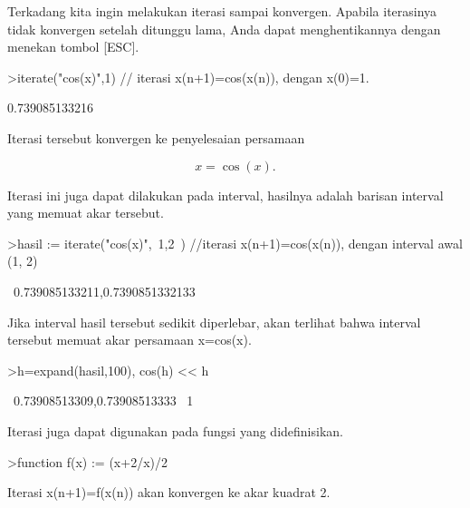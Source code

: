 \documentclass[a4paper,10pt]{article}
\begin{document}
\begin{eulernotebook}
\begin{eulercomment}
\end{eulercomment}
\begin{eulercomment}
Terkadang kita ingin melakukan iterasi sampai konvergen. Apabila
iterasinya tidak konvergen setelah ditunggu lama, Anda dapat
menghentikannya dengan menekan tombol [ESC].
\end{eulercomment}
\begin{eulerprompt}
>iterate("cos(x)",1) // iterasi x(n+1)=cos(x(n)), dengan x(0)=1.
\end{eulerprompt}
\begin{euleroutput}
  0.739085133216
\end{euleroutput}
\begin{eulercomment}
Iterasi tersebut konvergen ke penyelesaian persamaan

\end{eulercomment}
\begin{eulerformula}
\[
x = \cos(x).
\]
\end{eulerformula}
\begin{eulercomment}
Iterasi ini juga dapat dilakukan pada interval, hasilnya adalah
barisan interval yang memuat akar tersebut.
\end{eulercomment}
\begin{eulerprompt}
>hasil := iterate("cos(x)",~1,2~) //iterasi x(n+1)=cos(x(n)), dengan interval awal (1, 2)
\end{eulerprompt}
\begin{euleroutput}
  ~0.739085133211,0.7390851332133~
\end{euleroutput}
\begin{eulercomment}
Jika interval hasil tersebut sedikit diperlebar, akan terlihat bahwa
interval tersebut memuat akar persamaan x=cos(x).
\end{eulercomment}
\begin{eulerprompt}
>h=expand(hasil,100), cos(h) << h
\end{eulerprompt}
\begin{euleroutput}
  ~0.73908513309,0.73908513333~
  1
\end{euleroutput}
\begin{eulercomment}
Iterasi juga dapat digunakan pada fungsi yang didefinisikan.
\end{eulercomment}
\begin{eulerprompt}
>function f(x) := (x+2/x)/2
\end{eulerprompt}
\begin{eulercomment}
Iterasi x(n+1)=f(x(n)) akan konvergen ke akar kuadrat 2.

\end{eulercomment}
\end{eulernotebook}
\end{document}
